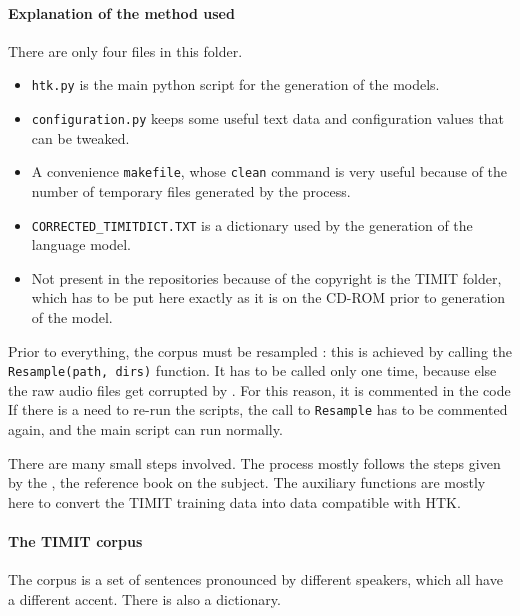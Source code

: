 \paragraph{Explanation of the method used}
There are only four files in this folder.
\begin{itemize}
\item \texttt{htk.py} is the main python script for the generation of the models.
\item \texttt{configuration.py} keeps some useful text data and configuration values that can be tweaked.
\item A convenience \texttt{makefile}, whose \texttt{clean} command is very useful because of the number of temporary files generated by the process.
\item \texttt{CORRECTED\_TIMITDICT.TXT} is a dictionary used by the generation of the language model.
\item Not present in the repositories because of the copyright is the \ac{TIMIT} folder, which has to be put here exactly as it is on the CD-ROM prior to generation of the model.
\end{itemize}

Prior to everything, the corpus must be resampled : this is achieved by calling the \texttt{Resample(path, dirs)} function. It has to be called only one time, because else the raw audio files get corrupted by . For this reason, it is commented in the code
If there is a need to re-run the scripts, the call to \texttt{Resample} has to be commented again, and the main script can run normally.

There are many small steps involved. The process mostly follows the steps given by the \cite{htkbook}, the reference book on the subject.
The auxiliary functions are mostly here to convert the \ac{TIMIT} training data into data compatible with \ac{HTK}.

\paragraph{The TIMIT corpus}
The corpus is a set of sentences pronounced by different speakers, which all have a different accent. There is also a dictionary.

